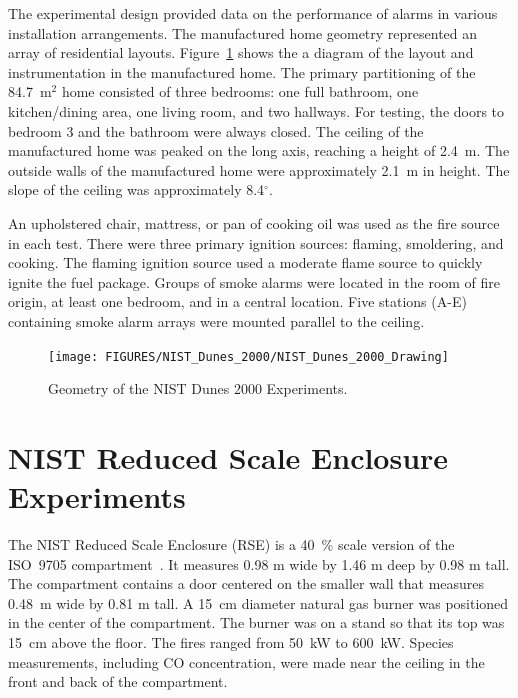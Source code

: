 The experimental design provided data on the performance of alarms in various installation arrangements.
The manufactured home geometry represented an array of residential layouts.
Figure~\ref{NIST_Dunes_2000_Drawing} shows the a diagram of the layout and instrumentation in the
manufactured home. The primary partitioning of the 84.7~m$^2$ home consisted of three bedrooms:
one full bathroom, one kitchen/dining area, one living room, and two hallways. For testing, the doors
to bedroom 3 and the bathroom were always closed. The ceiling of the manufactured home
was peaked on the long axis, reaching a height of 2.4~m. The outside walls of the manufactured home
were approximately 2.1~m in height. The slope of the ceiling was approximately 8.4$^\circ$.

An upholstered chair, mattress, or pan of cooking oil was used as the fire source in each test.
There were three primary ignition sources: flaming, smoldering, and cooking.
The flaming ignition source used a moderate flame source to quickly ignite the fuel package.
Groups of smoke alarms were located in the room of fire origin, at least one bedroom, and
in a central location. Five stations (A-E) containing smoke alarm arrays were mounted parallel to the ceiling.

\begin{figure}
\begin{center}
\texttt{[image: FIGURES/NIST\_Dunes\_2000/NIST\_Dunes\_2000\_Drawing]}
\end{center}
\caption[Geometry of the NIST Dunes 2000 Experiments]{Geometry of the NIST Dunes 2000 Experiments.}
\label{NIST_Dunes_2000_Drawing}
\end{figure}


\clearpage

\section{NIST Reduced Scale Enclosure Experiments}

The NIST Reduced Scale Enclosure (RSE) is a 40~\% scale version of the ISO~9705 compartment~\cite{Bryner:1}.
It measures 0.98 m wide by 1.46 m deep by 0.98 m tall.  The compartment contains a door centered on the smaller
wall that measures 0.48~m wide by 0.81 m tall.  A 15~cm diameter natural gas burner was positioned in the
center of the compartment.  The burner was on a stand so that its top was 15~cm above the floor.
The fires ranged from 50~kW to 600~kW.
Species measurements, including CO concentration, were made near the ceiling in the front and back of the compartment.


